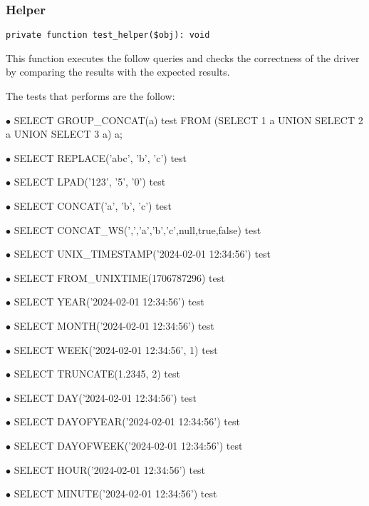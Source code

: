 \documentclass[a4paper]{article}
\begin{document}
\hypertarget{toc133}{}
\subsubsection{Helper}

\begin{lstlisting}
private function test_helper($obj): void
\end{lstlisting}

This function executes the follow queries and checks the correctness
of the driver by comparing the results with the expected results.

The tests that performs are the follow:

\begin{compactitem}
\item[\color{myblue}$\bullet$] SELECT GROUP\_CONCAT(a) test FROM (SELECT 1 a UNION SELECT 2 a UNION SELECT 3 a) a;
\item[\color{myblue}$\bullet$] SELECT REPLACE('abc', 'b', 'c') test
\item[\color{myblue}$\bullet$] SELECT LPAD('123', '5', '0') test
\item[\color{myblue}$\bullet$] SELECT CONCAT('a', 'b', 'c') test
\item[\color{myblue}$\bullet$] SELECT CONCAT\_WS(',','a','b','c',null,true,false) test
\item[\color{myblue}$\bullet$] SELECT UNIX\_TIMESTAMP('2024-02-01 12:34:56') test
\item[\color{myblue}$\bullet$] SELECT FROM\_UNIXTIME(1706787296) test
\item[\color{myblue}$\bullet$] SELECT YEAR('2024-02-01 12:34:56') test
\item[\color{myblue}$\bullet$] SELECT MONTH('2024-02-01 12:34:56') test
\item[\color{myblue}$\bullet$] SELECT WEEK('2024-02-01 12:34:56', 1) test
\item[\color{myblue}$\bullet$] SELECT TRUNCATE(1.2345, 2) test
\item[\color{myblue}$\bullet$] SELECT DAY('2024-02-01 12:34:56') test
\item[\color{myblue}$\bullet$] SELECT DAYOFYEAR('2024-02-01 12:34:56') test
\item[\color{myblue}$\bullet$] SELECT DAYOFWEEK('2024-02-01 12:34:56') test
\item[\color{myblue}$\bullet$] SELECT HOUR('2024-02-01 12:34:56') test
\item[\color{myblue}$\bullet$] SELECT MINUTE('2024-02-01 12:34:56') test

\end{compactitem}
\end{document}
